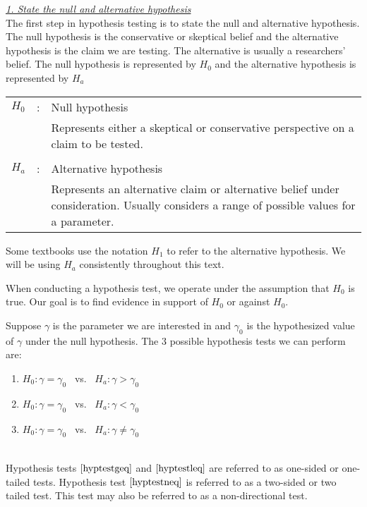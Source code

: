 \noindent
{\em \underline{1. State the null and alternative hypothesis} }\\

\noindent
The first step in hypothesis testing is to state the null and alternative hypothesis. The null hypothesis is the conservative or skeptical belief and the alternative hypothesis is the claim we are testing. The alternative is usually a researchers' belief. The null hypothesis is represented by $H_{0}$  and the alternative hypothesis is represented by $H_{a}$

\begin{definition}	
\begin{tabular}{l c m{14.75cm} }
$H_{0}$	& : &	Null hypothesis	\\	\index{Hypothesis!Null hypothesis}
		&   &	Represents either a skeptical or conservative perspective on a claim to
			be tested.\\
\hfill\\
$H_{a}$	& : &	Alternative hypothesis	\\	\index{Hypothesis!Alternative hypothesis}
		&   &	Represents an alternative claim or alternative belief 
			under consideration. 
			Usually considers a range of possible values for a parameter.
\end{tabular}
\end{definition}



\begin{nt}
Some textbooks use the notation $H_{1}$ to refer to the alternative hypothesis. We will be using $H_{a}$ consistently throughout this text.
\end{nt}

\noindent
When conducting a hypothesis test, we operate under the assumption that $H_{0}$ is true. Our goal is to find evidence in support of $H_0$ or against $H_0$. 

\begin{definition}	
Suppose $\gamma$ is the parameter we are interested in and $\gamma_{0}$ is the hypothesized value of 
$\gamma$ under the null hypothesis. 
The 3 possible hypothesis tests we can perform are:\\
	
	\begin{enumerate}
	\item	$H_{0} : \gamma = \gamma_{0}$ ~vs.~ $H_{a}  : \gamma > \gamma_{0}$
		\label{hyptestgeq}
	\item	$H_{0} : \gamma = \gamma_{0}$ ~vs.~ $H_{a}  : \gamma < \gamma_{0}$
		\label{hyptestleq}
	\item	$H_{0} : \gamma = \gamma_{0}$ ~vs.~ $H_{a}  : \gamma \neq \gamma_{0}$
		\label{hyptestneq}
	\end{enumerate}
\hfill\\
\noindent
Hypothesis tests $\ref{hyptestgeq}$ and $\ref{hyptestleq}$ are referred to as  one-sided or one-tailed tests. Hypothesis test $\ref{hyptestneq}$ is referred to as a two-sided or two tailed test. This test may also be referred to as a non-directional test.
\end{definition}

